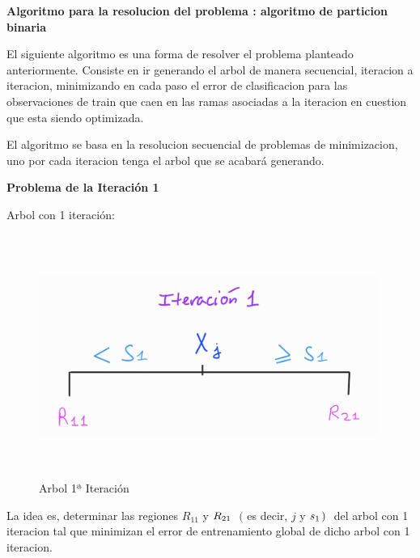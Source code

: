 \documentclass[
  11pt,
  a4paper,
]{article}
\begin{document}
\newpage

\textbf{Algoritmo para la resolucion del problema : algoritmo de
particion binaria}

\vspace{0.2cm}

El siguiente algoritmo es una forma de resolver el problema planteado
anteriormente. Consiste en ir generando el arbol de manera secuencial,
iteracion a iteracion, minimizando en cada paso el error de
clasificacion para las observaciones de train que caen en las ramas
asociadas a la iteracion en cuestion que esta siendo optimizada.

El algoritmo se basa en la resolucion secuencial de problemas de
minimizacion, uno por cada iteracion tenga el arbol que se acabará
generando.

\vspace{0.5cm}

\textbf{Problema de la Iteración 1}

Arbol con 1 iteración:

\begin{figure}
\centering
\includegraphics[width=4.375in,height=3.125in]{output_465_0.jpg}
\caption{Arbol 1ª Iteración}
\end{figure}

\vspace{0.5cm}

La idea es, determinar las regiones \(R_{11}\) y
\(R_{21}\hspace{0.1cm}\) \((\) es decir, \(j\) y
\(s_1 \hspace{0.05cm}) \hspace{0.1cm}\) del arbol con 1 iteracion tal
que minimizan el error de entrenamiento global de dicho arbol con 1
iteracion.

\vspace{0.5cm}
\end{document}
